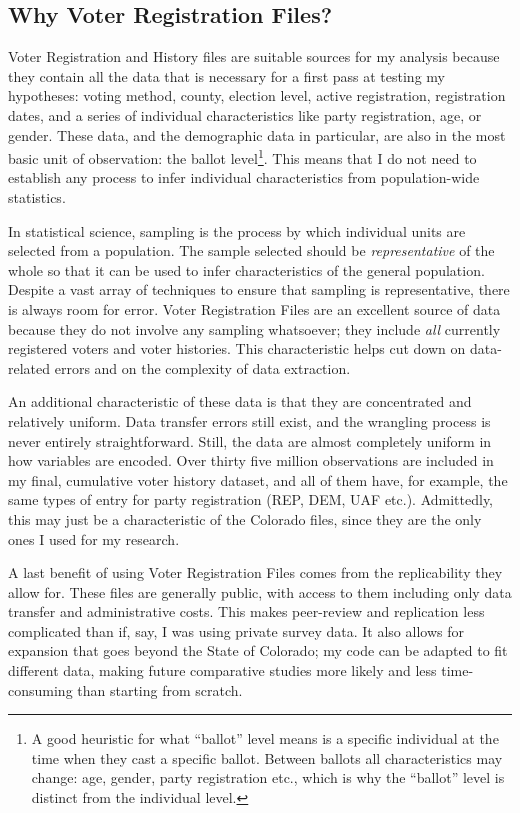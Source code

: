 \documentclass[12pt,twoside]{reedthesis}
\begin{document}
  \subsection{Why Voter Registration
  Files?}\label{why-voter-registration-files}
  
  Voter Registration and History files are suitable sources for my
  analysis because they contain all the data that is necessary for a first
  pass at testing my hypotheses: voting method, county, election level,
  active registration, registration dates, and a series of individual
  characteristics like party registration, age, or gender. These data, and
  the demographic data in particular, are also in the most basic unit of
  observation: the ballot level\footnote{A good heuristic for what
    ``ballot'' level means is a specific individual at the time when they
    cast a specific ballot. Between ballots all characteristics may
    change: age, gender, party registration etc., which is why the
    ``ballot'' level is distinct from the individual level.}. This means
  that I do not need to establish any process to infer individual
  characteristics from population-wide statistics.
  
  In statistical science, sampling is the process by which individual
  units are selected from a population. The sample selected should be
  \emph{representative} of the whole so that it can be used to infer
  characteristics of the general population. Despite a vast array of
  techniques to ensure that sampling is representative, there is always
  room for error. Voter Registration Files are an excellent source of data
  because they do not involve any sampling whatsoever; they include
  \emph{all} currently registered voters and voter histories. This
  characteristic helps cut down on data-related errors and on the
  complexity of data extraction.
  
  An additional characteristic of these data is that they are concentrated
  and relatively uniform. Data transfer errors still exist, and the
  wrangling process is never entirely straightforward. Still, the data are
  almost completely uniform in how variables are encoded. Over thirty five
  million observations are included in my final, cumulative voter history
  dataset, and all of them have, for example, the same types of entry for
  party registration (REP, DEM, UAF etc.). Admittedly, this may just be a
  characteristic of the Colorado files, since they are the only ones I
  used for my research.
  
  A last benefit of using Voter Registration Files comes from the
  replicability they allow for. These files are generally public, with
  access to them including only data transfer and administrative costs.
  This makes peer-review and replication less complicated than if, say, I
  was using private survey data. It also allows for expansion that goes
  beyond the State of Colorado; my code can be adapted to fit different
  data, making future comparative studies more likely and less
  time-consuming than starting from scratch.
  
\end{document}
